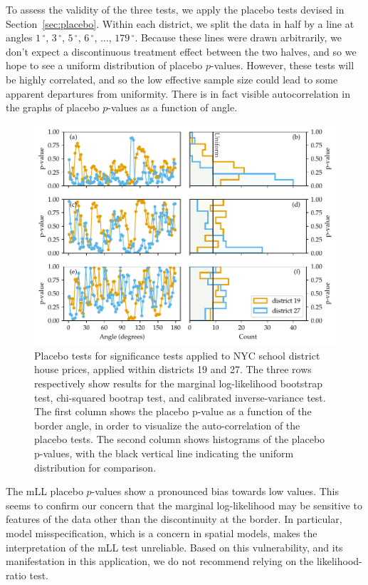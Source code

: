 \documentclass[letter]{article}
\makeatletter
\def\maxwidth{\ifdim\Gin@nat@width>\linewidth\linewidth
\else\Gin@nat@width\fi}
\let\Oldincludegraphics\includegraphics
\renewcommand{\includegraphics}[1]{\Oldincludegraphics[width=0.9\maxwidth]{#1}}
\newcommand{\degree}{{\,^\circ}}
\makeatother
\begin{document}
    	To assess the validity of the three tests, we apply the placebo tests devised in Section~\ref{sec:placebo}.
Within each district, we split the data in half by a line at angles \(1\degree\), \(3\degree\), \(5\degree\), \(6\degree\), \(\dotsc\), \(179\degree\).
Because these lines were drawn arbitrarily, we don't expect a discontinuous treatment effect between the two halves, and so we hope to see a uniform distribution of placebo \(p\)-values.
However, these tests will be highly correlated,
and so the low effective sample size could lead to some apparent departures from uniformity.
There is in fact visible autocorrelation in the graphs of placebo \(p\)-values as a function of angle.
    


    	\begin{figure}
\centering
\includegraphics{../NYC/NYC_plots/NYC_placebos.pdf}
\caption{\label{fig:nyc_placebos} Placebo tests for significance tests applied to NYC school district house prices, applied within districts 19 and 27. The three rows respectively show results for the marginal log-likelihood bootstrap test, chi-squared bootrap test, and calibrated inverse-variance test. The first column shows the placebo p-value as a function of the border angle, in order to visualize the auto-correlation of the placebo tests. The second column shows histograms of the placebo p-values, with the black vertical line indicating the uniform distribution for comparison.}
\end{figure}
    


    	The mLL placebo \(p\)-values show a pronounced bias towards low values.
This seems to confirm our concern that the marginal log-likelihood may be sensitive to features of the data other than the discontinuity at the border.
In particular, model misspecification, which is a concern in spatial models, makes the interpretation of the mLL test unreliable.
Based on this vulnerability, and its manifestation in this application, we do not recommend relying on the likelihood-ratio test.
\end{document}
